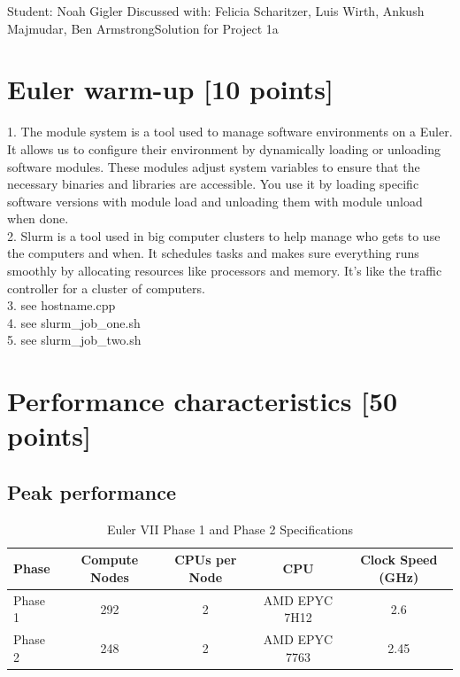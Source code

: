 \documentclass[unicode,11pt,a4paper,oneside,numbers=endperiod,openany]{scrartcl}
\begin{document}
\setassignment
{}

            {Student: Noah Gigler}
            {Discussed with: Felicia Scharitzer, Luis Wirth, Ankush Majmudar, Ben Armstrong}{Solution for Project 1a}{}
\newline

\assignmentpolicy

\section{Euler warm-up [10 points]}

1. The module system is a tool used to manage software environments on a Euler. 
It allows us to configure their environment by dynamically loading or unloading software modules. 
These modules adjust system variables to ensure that the necessary binaries and libraries are accessible.
You use it by loading specific software versions with module load and unloading them with module unload when done.
\\
2. Slurm is a tool used in big computer clusters to help manage who gets to use the computers and when. 
It schedules tasks and makes sure everything runs smoothly by allocating resources like processors and memory.
It's like the traffic controller for a cluster of computers.
\\
3.
see hostname.cpp
\\
4.
see slurm\_job\_one.sh
\\
5.
see slurm\_job\_two.sh

\section{Performance characteristics [50 points]}

\subsection{Peak performance}

\begin{table}[ht]
\centering
\caption{Euler VII Phase 1 and Phase 2 Specifications}
\begin{tabular}{|l|c|c|c|c|}
\hline
\textbf{Phase} & \textbf{Compute Nodes} & \textbf{CPUs per Node} & \textbf{CPU} & \textbf{Clock Speed (GHz)} \\ \hline
Phase 1        & 292                    & 2                      & AMD EPYC 7H12 & 2.6                        \\ \hline
Phase 2        & 248                    & 2                      & AMD EPYC 7763 & 2.45                       \\ \hline
\end{tabular}
\end{table}
\end{document}
